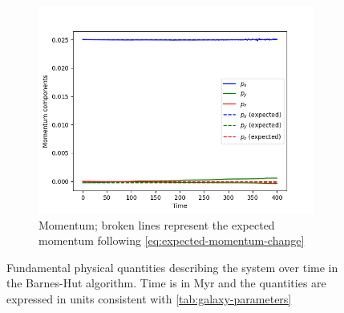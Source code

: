 \begin{figure}[htp]
    \vspace{0.2cm}

    \begin{subfigure}[b]{0.45\textwidth}
        \centering
        \includegraphics[width=\textwidth]{chapters/results/img/pm-collision/momentum.png}
        \caption{Momentum; broken lines represent the expected momentum following \autoref{eq:expected-momentum-change}}
        \label{fig:physical-quantities-pm-collision-sub3}
    \end{subfigure}

    \caption{Fundamental physical quantities describing the system over time in the Barnes-Hut algorithm.
        Time is in Myr and the quantities are expressed in units consistent with \autoref{tab:galaxy-parameters}}
    \label{fig:physical-quantities-pm-collision}
\end{figure}

